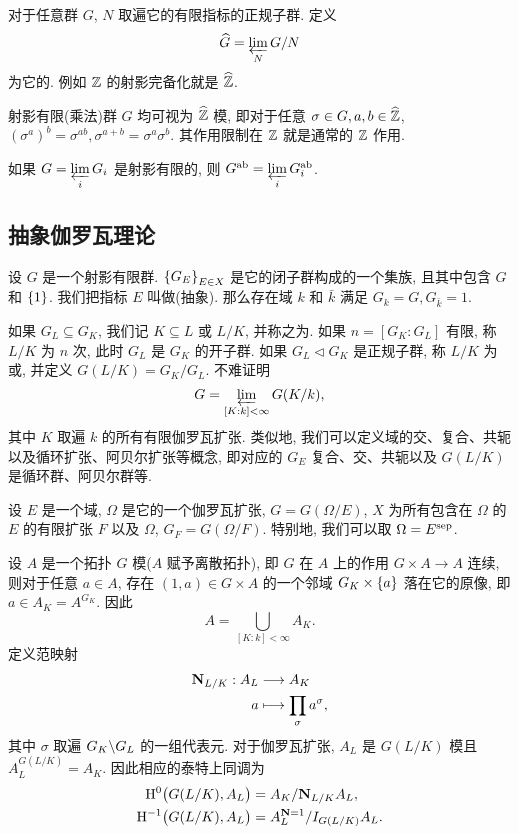 \begin{example}
对于任意群 $G$, $N$ 取遍它的有限指标的正规子群. 定义
  \[\widehat G=\varprojlim\limits_N G/N\]
为它的. 例如 ${\mathbb{Z}}$ 的射影完备化就是 $\widehat {{\mathbb{Z}}}$.
\end{example}

\begin{exercise}
射影有限(乘法)群 $G$ 均可视为 $\widehat {{\mathbb{Z}}}$ 模, 即对于任意 $\sigma\in G,a,b\in\widehat{{\mathbb{Z}}}$, $(\sigma^a)^b=\sigma^{ab},\sigma^{a+b}=\sigma^a\sigma^b$. 其作用限制在 ${\mathbb{Z}}$ 就是通常的 ${\mathbb{Z}}$ 作用.
\end{exercise}

\begin{exercise}
如果 $G=\varprojlim\limits_i G_i$ 是射影有限的, 则 $G^{\mathrm{ab}}=\varprojlim\limits_i G_i^{\mathrm{ab}}$.
\end{exercise}


\subsection{抽象伽罗瓦理论}
设 $G$ 是一个射影有限群.
$\left\{G_E\right\}_{E\in X}$ 是它的闭子群构成的一个集族, 且其中包含 $G$ 和 $\left\{1\right\}$.
我们把指标 $E$ 叫做(抽象).
那么存在域 $k$ 和 $\bar k$ 满足 $G_k=G,G_{\bar k}=1$.

如果 $G_L\subseteq G_K$, 我们记 $K\subseteq L$ 或 $L/K$, 并称之为.
如果 $n=[G_K:G_L]$ 有限, 称 $L/K$ 为 $n$ 次, 此时 $G_L$ 是 $G_K$ 的开子群.
如果 $G_L\triangleleft G_K$ 是正规子群, 称 $L/K$ 为或, 并定义 $G(L/K)=G_K/G_L$.
不难证明
\[G=\varprojlim\limits_{[K:k]<\infty} G(K/k),\]
其中 $K$ 取遍 $k$ 的所有有限伽罗瓦扩张.
类似地, 我们可以定义域的交、复合、共轭以及循环扩张、阿贝尔扩张等概念, 即对应的 $G_E$ 复合、交、共轭以及 $G(L/K)$ 是循环群、阿贝尔群等.

\begin{example}
设 $E$ 是一个域, $\Omega$ 是它的一个伽罗瓦扩张, $G=G(\Omega/E)$, $X$ 为所有包含在 $\Omega$ 的 $E$ 的有限扩张 $F$ 以及 $\Omega$, $G_F=G(\Omega/F)$. 特别地, 我们可以取 $\Omega=E^{\mathrm{sep}}$.
\end{example}

设 $A$ 是一个拓扑 $G$ 模($A$ 赋予离散拓扑), 即 $G$ 在 $A$ 上的作用 $G\times A\to A$ 连续, 则对于任意 $a\in A$, 存在 $(1,a)\in G\times A$ 的一个邻域 $G_K\times \left\{a\right\}$ 落在它的原像, 即 $a\in A_K=A^{G_K}$. 因此
  \[A=\bigcup_{[K:k]<\infty} A_K.\]
定义范映射
  \[\begin{split}{\mathbf{N}}_{L/K}: A_L &\longrightarrow A_K \\ a &\longmapsto \prod_\sigma a^\sigma,\end{split}\]
其中 $\sigma$ 取遍 $G_K\backslash G_L$ 的一组代表元. 对于伽罗瓦扩张, $A_L$ 是 $G(L/K)$ 模且 $A_L^{G(L/K)}=A_K$.
因此相应的泰特上同调为
  \[\begin{split}
	{\mathrm{H}}^0\bigl(G(L/K),A_L\bigr)&=A_K/{\mathbf{N}}_{L/K}A_L,\\
	{\mathrm{H}}^{-1}\bigl(G(L/K),A_L\bigr)&=A_L^{{\mathbf{N}}=1}/I_{G(L/K)} A_L.
	\end{split}\]

